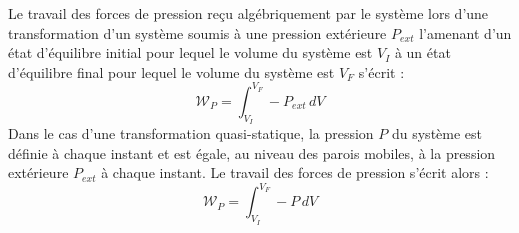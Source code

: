 \documentclass{article}
\begin{document}
\begin{adjustwidth}{-3cm}{-3cm}
    \pagecolor{rose}
    Le travail des forces de pression reçu algébriquement par le système lors d’une transformation d’un système soumis à une pression extérieure $P_{ext}$ l’amenant d’un état d’équilibre initial pour lequel le volume du système est $V_I$ à un état d’équilibre final pour lequel le volume du système est $V_F$ s’écrit :
    $$ \mathcal{W}_P = \int_{V_I}^{V_F} -P_{ext} \,dV  $$
    Dans le cas d'une transformation quasi-statique, la pression $P$ du système est définie à chaque instant et est égale, au niveau des parois mobiles, à la pression extérieure $P_{ext}$ à chaque instant. Le travail des forces de pression s'écrit alors :
    $$ \mathcal{W}_P = \int_{V_I}^{V_F} -P \,dV  $$ 

\end{adjustwidth}
\end{document}
